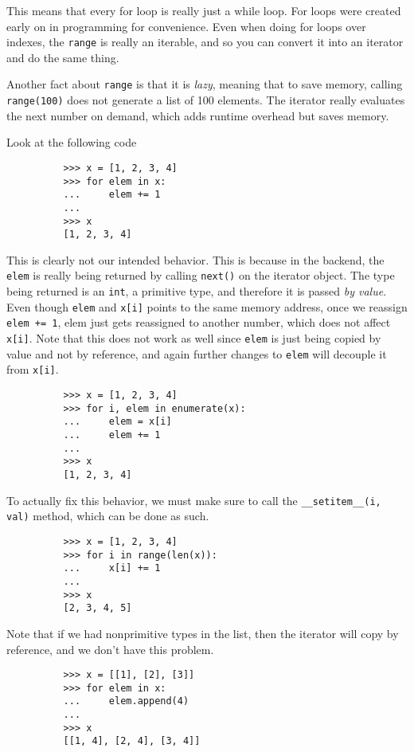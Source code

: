 \documentclass{article}
\begin{document}
      This means that every for loop is really just a while loop. For loops were created early on in programming for convenience. Even when doing for loops over indexes, the \texttt{range} is really an iterable, and so you can convert it into an iterator and do the same thing. 

      Another fact about \texttt{range} is that it is \textit{lazy}, meaning that to save memory, calling \texttt{range(100)} does not generate a list of 100 elements. The iterator really evaluates the next number on demand, which adds runtime overhead but saves memory.   

      \begin{example}
        Look at the following code 
        \begin{lstlisting}
          >>> x = [1, 2, 3, 4]
          >>> for elem in x: 
          ...     elem += 1 
          ... 
          >>> x
          [1, 2, 3, 4] 
        \end{lstlisting}
        This is clearly not our intended behavior. This is because in the backend, the \texttt{elem} is really being returned by calling \texttt{next()} on the iterator object. The type being returned is an \texttt{int}, a primitive type, and therefore it is passed \textit{by value}. Even though \texttt{elem} and \texttt{x[i]} points to the same memory address, once we reassign \texttt{elem += 1}, elem just gets reassigned to another number, which does not affect \texttt{x[i]}. Note that this does not work as well since \texttt{elem} is just being copied by value and not by reference, and again further changes to \texttt{elem} will decouple it from \texttt{x[i]}. 
        \begin{lstlisting}
          >>> x = [1, 2, 3, 4] 
          >>> for i, elem in enumerate(x): 
          ...     elem = x[i]
          ...     elem += 1
          ... 
          >>> x
          [1, 2, 3, 4] 
        \end{lstlisting}
        To actually fix this behavior, we must make sure to call the \texttt{\_\_setitem\_\_(i, val)} method, which can be done as such. 
        \begin{lstlisting}
          >>> x = [1, 2, 3, 4]
          >>> for i in range(len(x)): 
          ...     x[i] += 1 
          ... 
          >>> x
          [2, 3, 4, 5] 
        \end{lstlisting}
        Note that if we had nonprimitive types in the list, then the iterator will copy by reference, and we don't have this problem. 
        \begin{lstlisting}
          >>> x = [[1], [2], [3]]
          >>> for elem in x: 
          ...     elem.append(4)
          ... 
          >>> x
          [[1, 4], [2, 4], [3, 4]] 
        \end{lstlisting}
      \end{example}
\end{document}
